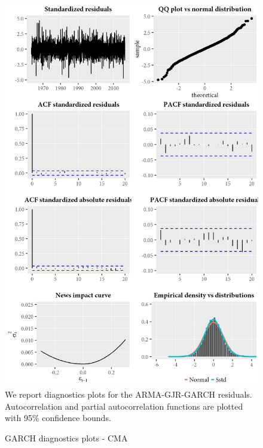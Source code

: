 \begin{figure}[H]
  \caption{GARCH diagnostics plots - CMA}
  \label{diag:garchdiagCMA}
  \centering
  \begin{minipage}{\textwidth}
  \includegraphics[scale=1]{graphics/garch/garch_diagnosticsCMA.png}  
  \vspace{3mm}
  \footnotesize
  We report diagnostics plots for the ARMA-GJR-GARCH residuals. Autocorrelation and partial autocorrelation functions are plotted with 95\% confidence bounds.
  \end{minipage}
\end{figure}